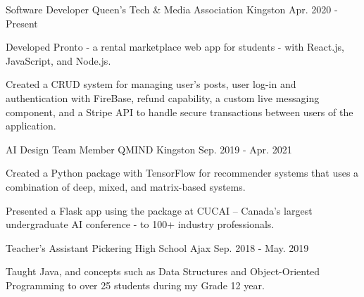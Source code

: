 

\begin{cventries}

  \cventry
    {Software Developer} %
    {Queen’s Tech \& Media Association} %
    {Kingston} %
    {Apr. 2020 - Present} %
    {
      \begin{cvitems} %
        \item {Developed Pronto - a rental marketplace web app for students - with React.js, JavaScript, and Node.js.}
        \item {Created a CRUD system for managing user’s posts, user log-in and authentication with FireBase, refund capability, a custom live messaging component, and a Stripe API to handle secure transactions between users of the application.}
      \end{cvitems}
    }

  \cventry
    {AI Design Team Member} %
    {QMIND} %
    {Kingston} %
    {Sep. 2019 - Apr. 2021} %
    {
      \begin{cvitems} %
        \item {Created a Python package with TensorFlow for recommender systems that uses a combination of deep, mixed, and matrix-based systems.}
        \item {Presented a Flask app using the package at CUCAI – Canada’s largest undergraduate AI conference - to 100+ industry professionals.}
      \end{cvitems}
    }

  \cventry
    {Teacher's Assistant} %
    {Pickering High School} %
    {Ajax} %
    {Sep. 2018 - May. 2019} %
    {
      \begin{cvitems} %
        \item {Taught Java, and concepts such as Data Structures and Object-Oriented Programming to over 25 students during my Grade 12 year.}
      \end{cvitems}
    }


\end{cventries}
